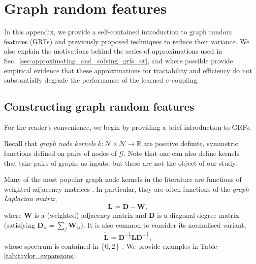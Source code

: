 \section{Graph random features} \label{app:grfs_all}
In this appendix, we provide a self-contained introduction to graph random features (GRFs) and previously proposed techniques to reduce their variance.
We also explain the motivations behind the series of approximations used in Sec.~\ref{sec:approximating_and_solving_grfs_ot}, and where possible provide empirical evidence that these approximations for tractability and efficiency do not substantially degrade the performance of the learned $\sigma$-coupling.

\subsection{Constructing graph random features} \label{app:grf_approx}
For the reader's convenience, we begin by providing a brief introduction to GRFs. 

Recall that \emph{graph node kernels} $k: \mathcal{N} \times \mathcal{N} \to \mathbb{R}$ are positive definite, symmetric functions defined on pairs of nodes of $\mathcal{G}$. Note that one can also define kernels that take pairs of graphs as inputs, but these are not the object of our study. 

Many of the most popular graph node kernels in the literature are functions of weighted adjacency matrices \citep{smola2003kernels,chapelle2002cluster}. In particular, they are often functions of the \emph{graph Laplacian matrix},
\begin{equation}
    \mathbf{L} \coloneqq \mathbf{D} - \mathbf{W},
\end{equation}
where $\mathbf{W}$ is a (weighted) adjacency matrix and $\mathbf{D}$ is a diagonal degree matrix (satisfying $\mathbf{D}_{ii} = \sum_j \mathbf{W}_{ij}$). 
It is also common to consider its normalised variant,
\begin{equation} \label{eq:graph_lap}
    \widetilde{\mathbf{L}} \coloneqq \mathbf{D}^{-\frac{1}{2}} \mathbf{L} \mathbf{D}^{-\frac{1}{2}}, 
\end{equation}
whose spectrum is contained in $[0,2]$ \citep{chung1997spectral}. We provide examples in Table \ref{tab:taylor_expansions}.

